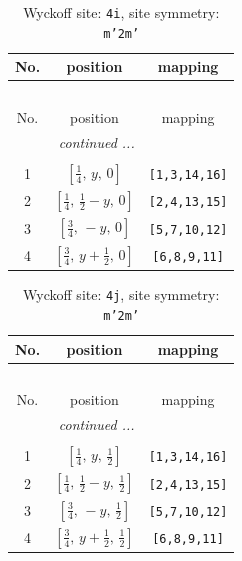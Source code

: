 \documentclass[fleqn,8pt]{jsarticle}
\begin{document}
\renewcommand{\arraystretch}{1.2}
\begin{longtable}{ccc}
\caption{Wyckoff site: {\tt 4i}, site symmetry: {\tt m'2m'}}
 \\
 \hline \hline
No. & position & mapping \\ \hline \endfirsthead

\multicolumn{2}{l}{\tablename\ \thetable{}} \\
 \hline \hline
No. & position & mapping \\ \hline \endhead

 \hline \hline
\multicolumn{2}{r}{\footnotesize\it continued ...} \\ \endfoot

 \hline \hline
\multicolumn{2}{r}{} \\ \endlastfoot

1 & $\left[ \frac{1}{4},\, y,\, 0 \right]$ & {\tt [1,3,14,16]} \\ \hline
2 & $\left[ \frac{1}{4},\, \frac{1}{2} - y,\, 0 \right]$ & {\tt [2,4,13,15]} \\ \hline
3 & $\left[ \frac{3}{4},\, - y,\, 0 \right]$ & {\tt [5,7,10,12]} \\ \hline
4 & $\left[ \frac{3}{4},\, y + \frac{1}{2},\, 0 \right]$ & {\tt [6,8,9,11]} \\
\end{longtable}
\renewcommand{\arraystretch}{1.2}
\begin{longtable}{ccc}
\caption{Wyckoff site: {\tt 4j}, site symmetry: {\tt m'2m'}}
 \\
 \hline \hline
No. & position & mapping \\ \hline \endfirsthead

\multicolumn{2}{l}{\tablename\ \thetable{}} \\
 \hline \hline
No. & position & mapping \\ \hline \endhead

 \hline \hline
\multicolumn{2}{r}{\footnotesize\it continued ...} \\ \endfoot

 \hline \hline
\multicolumn{2}{r}{} \\ \endlastfoot

1 & $\left[ \frac{1}{4},\, y,\, \frac{1}{2} \right]$ & {\tt [1,3,14,16]} \\ \hline
2 & $\left[ \frac{1}{4},\, \frac{1}{2} - y,\, \frac{1}{2} \right]$ & {\tt [2,4,13,15]} \\ \hline
3 & $\left[ \frac{3}{4},\, - y,\, \frac{1}{2} \right]$ & {\tt [5,7,10,12]} \\ \hline
4 & $\left[ \frac{3}{4},\, y + \frac{1}{2},\, \frac{1}{2} \right]$ & {\tt [6,8,9,11]} \\
\end{longtable}
\end{document}
